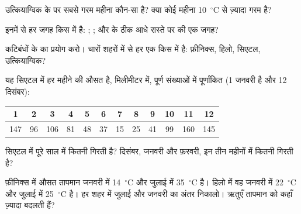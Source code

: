 \begin{exercise}[$\star$]\label{exo:g5:weather-and-climate:4}
उत्कियाग्विक के  पर सबसे गरम महीना कौन-सा है? क्या कोई महीना
10~$^\circ$C से ज़्यादा गरम है?
\end{exercise}

\begin{exercise}[$\star$]\label{exo:g5:weather-and-climate:5}
इनमें से हर जगह किस  में है: ; ; 
और  के ठीक आधे रास्ते पर की एक जगह?
\end{exercise}

\begin{exercise}[$\star$]\label{exo:g5:weather-and-climate:6}
कटिबंधों के  का प्रयोग करो। चारों शहरों में से हर एक किस  में
है: फ़ीनिक्स, हिलो, सिएटल, उत्कियाग्विक?
\end{exercise}

\begin{exercise}[$\star\star$]\label{exo:g5:weather-and-climate:7}
यह सिएटल में हर महीने की औसत  है, मिलीमीटर में, पूर्ण संख्याओं में
पूर्णांकित (1 जनवरी है और 12 दिसंबर):
\begin{center}
\begin{tabular}{|*{12}{c|}}
\hline
1 & 2 & 3 & 4 & 5 & 6 & 7 & 8 & 9 & 10 & 11 & 12\\
\hline
147 & 96 & 106 & 81 & 48 & 37 & 15 & 25 & 41 & 99 & 160 & 145\\
\hline
\end{tabular}
\end{center}
सिएटल में पूरे साल में कितनी  गिरती है? दिसंबर, जनवरी और फ़रवरी, इन तीन
महीनों में कितनी गिरती है?
\end{exercise}

\begin{exercise}[$\star\star$]\label{exo:g5:weather-and-climate:8}
फ़ीनिक्स में औसत तापमान जनवरी में 14~$^\circ$C और जुलाई में
35~$^\circ$C है। हिलो में वह जनवरी में 22~$^\circ$C और जुलाई में
25~$^\circ$C है। हर शहर में जुलाई और जनवरी का अंतर निकालो। ऋतुएँ तापमान को
कहाँ ज़्यादा बदलती हैं?
\end{exercise}

